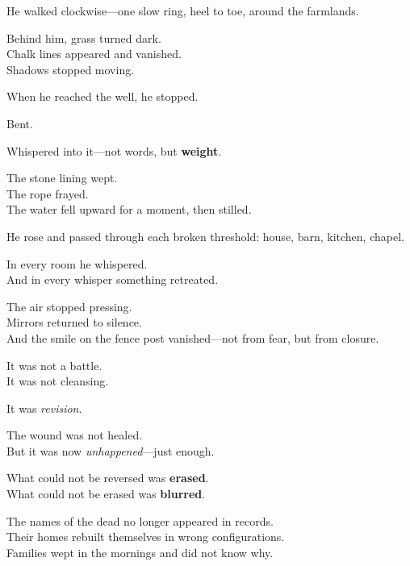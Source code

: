 \documentclass[9pt]{article}
\begin{document}
\vspace{0.5em}
He walked clockwise---one slow ring, heel to toe, around the farmlands.

\vspace{0.5em}
Behind him, grass turned dark.\\
Chalk lines appeared and vanished.\\
Shadows stopped moving.

\vspace{0.5em}
When he reached the well, he stopped.

\vspace{0.5em}
Bent.

\vspace{0.5em}
Whispered into it---not words, but \textbf{weight}.

\vspace{0.5em}
The stone lining wept.\\
The rope frayed.\\
The water fell upward for a moment, then stilled.

\vspace{0.5em}
He rose and passed through each broken threshold: house, barn, kitchen, chapel.

\vspace{0.5em}
In every room he whispered.\\
And in every whisper something retreated.

\vspace{0.5em}
The air stopped pressing.\\
Mirrors returned to silence.\\
And the smile on the fence post vanished---not from fear, but from closure.

\vspace{0.5em}
It was not a battle.\\
It was not cleansing.

\vspace{0.5em}
It was \textit{revision}.

\vspace{0.5em}
The wound was not healed.\\
But it was now \textit{unhappened}---just enough.

\vspace{0.5em}
What could not be reversed was \textbf{erased}.\\
What could not be erased was \textbf{blurred}.

\vspace{0.5em}
The names of the dead no longer appeared in records.\\
Their homes rebuilt themselves in wrong configurations.\\
Families wept in the mornings and did not know why.
\end{document}
